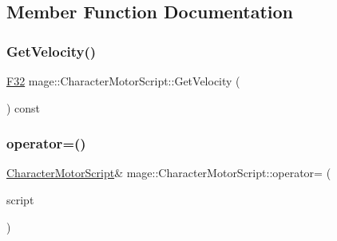 \subsection{Member Function Documentation}
\hypertarget{classmage_1_1_character_motor_script_a6a8997dfc2d924d803d526ff0fcc9fbd}{}\label{classmage_1_1_character_motor_script_a6a8997dfc2d924d803d526ff0fcc9fbd} 
\subsubsection{\texorpdfstring{Get\+Velocity()}{GetVelocity()}}
{\footnotesize\ttfamily \hyperlink{namespacemage_aa97e833b45f06d60a0a9c4fc22ae02c0}{F32} mage\+::\+Character\+Motor\+Script\+::\+Get\+Velocity (\begin{DoxyParamCaption}{ }\end{DoxyParamCaption}) const\hspace{0.3cm}{\ttfamily [noexcept]}}

\hypertarget{classmage_1_1_character_motor_script_a5b66cbbe6b829fe56a1bba5f9093b36e}{}\label{classmage_1_1_character_motor_script_a5b66cbbe6b829fe56a1bba5f9093b36e} 
\subsubsection{\texorpdfstring{operator=()}{operator=()}\hspace{0.1cm}{\footnotesize\ttfamily [1/2]}}
{\footnotesize\ttfamily \hyperlink{classmage_1_1_character_motor_script}{Character\+Motor\+Script}\& mage\+::\+Character\+Motor\+Script\+::operator= (\begin{DoxyParamCaption}\item[{const \hyperlink{classmage_1_1_character_motor_script}{Character\+Motor\+Script} \&}]{script }\end{DoxyParamCaption})\hspace{0.3cm}{\ttfamily [delete]}}

\hypertarget{classmage_1_1_character_motor_script_a05e8822fa633d8642702d125b26069f7}{}\label{classmage_1_1_character_motor_script_a05e8822fa633d8642702d125b26069f7} 
